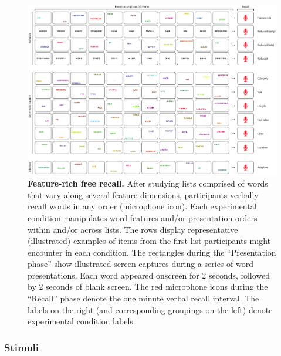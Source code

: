 \documentclass[11pt]{article}
\begin{document}
\begin{figure}[tp]
    \centering
        \includegraphics[width=\textwidth]{figures/FRFR}
        
\caption{\textbf{Feature-rich free recall.} After studying lists comprised of
words that vary along several feature dimensions, participants verbally recall
words in any order (microphone icon). Each experimental condition manipulates
word features and/or presentation orders within and/or across lists. The rows
display representative (illustrated) examples of items from the first list
participants might encounter in each condition. The rectangles during the
``Presentation phase'' show illustrated screen captures during a series of word
presentations. Each word appeared onscreen for 2 seconds, followed by 2 seconds
of blank screen. The red microphone icons during the ``Recall'' phase denote
the one minute verbal recall interval. The labels on the right (and
corresponding groupings on the left) denote experimental condition labels.}

    \label{fig:exp}
\end{figure}



\subsubsection*{Stimuli}
\end{document}
